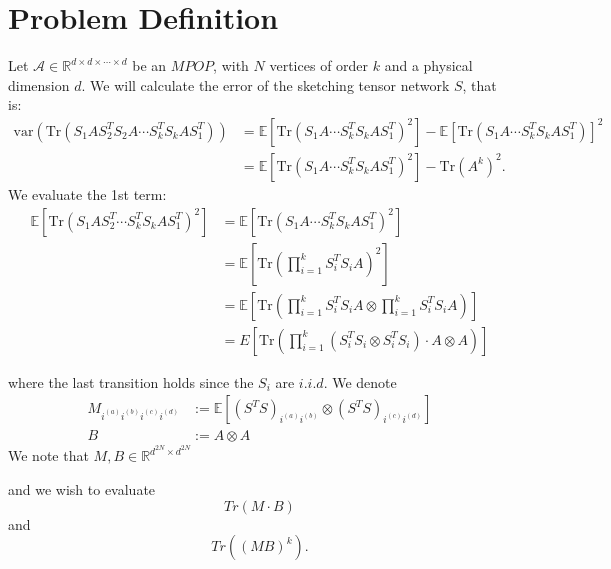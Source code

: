 \documentclass[12pt,a4paper]{article}
\newcommand{\R}{\mathbb{R}}
\begin{document}
\begin{center}
\end{center}
\tableofcontents 
\newpage
\vspace{0.5cm}
\section{Problem Definition}

Let $\mathcal{A}\in \R^{d\times d \times \cdots \times d}$  be an $MPOP$,  with $N$ vertices of order $k$ and a physical dimension $d$. We will calculate the error of the sketching tensor network $S$, that is: 
\begin{align}
\text{var}(\text{Tr}(S_{1}AS_{2}^{T}S_{2}A\cdots S_{k}^{T}S_{k}AS_{1}^{T})) & =\mathbb{E}[\text{Tr}(S_{1}A\cdots S_{k}^{T}S_{k}AS_{1}^{T})^{2}]-\mathbb{E}[\text{Tr}(S_{1}A\cdots S_{k}^{T}S_{k}AS_{1}^{T})]^{2}\\
 & =\mathbb{E}[\text{Tr}(S_{1}A\cdots S_{k}^{T}S_{k}AS_{1}^{T})^{2}]-\text{Tr}(A^{k})^{2}.\label{eq:target_eq}
\end{align}
We evaluate the 1st term: 
\begin{align}
\mathbb{E}[\text{Tr}(S_{1}AS_{2}^{T}\cdots S_{k}^{T}S_{k}AS_{1}^{T})^{2}] & =\mathbb{E}[\text{Tr}(S_{1}A\cdots S_{k}^{T}S_{k}AS_{1}^{T})^{2}]\nonumber\\
 & =\mathbb{E}[\text{Tr}(\prod_{i=1}^{k}S_{i}^{T}S_{i}A)^{2}]\nonumber\\
 & =\mathbb{E}[\text{Tr}(\prod_{i=1}^{k}S_{i}^{T}S_{i}A\otimes\prod_{i=1}^{k}S_{i}^{T}S_{i}A)]\nonumber\\
 & =E\left[\text{Tr}\left(\prod_{i=1}^{k}\left(S_{i}^{T}S_{i}\otimes S_{i}^{T}S_{i}\right)\cdot A\otimes A\right)\right]\label{eq:k_target}
 \end{align}
 

where the last transition holds since the $S_{i}$ are $i.i.d.$
We denote 
\begin{align}
       M_{i^{(a)}i^{(b)}i^{(c)}i^{(d)}}&:=\mathbb{E}[(S^{T}S)_{i^{(a)}i^{(b)}}\otimes(S^{T}S)_{i^{(c)}i^{(d)}}]\\
       B&:=A \otimes A \label{eq:M_def}
\end{align}
We note that $M,B\in \mathbb{R}^{d^{2N}\times d^{2N}}$


and we wish to evaluate 
\[
Tr(M \cdot B)
\]
and 
\[
Tr((MB)^k).
\]

\newpage
\end{document}
